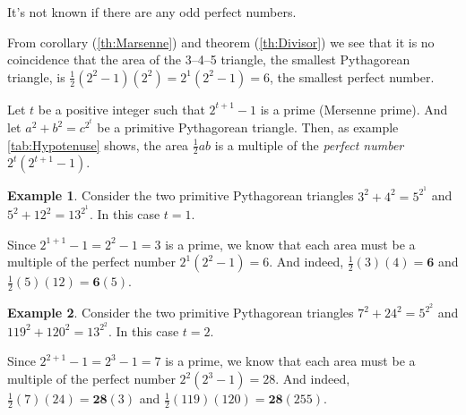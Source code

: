 \documentclass{article}
\theoremstyle{definition}
\newtheorem{example}{Example}[section]
\begin{document}
It's not known if there are any odd perfect numbers.

From corollary (\ref{th:Marsenne}) and theorem (\ref{th:Divisor}) we see that it is no coincidence that the area of the 3--4--5 triangle, the smallest Pythagorean triangle, is \(\frac{1}{2} (2^2-1) (2^2) = 2^1(2^2-1)=6\), the smallest perfect number.

Let \(t\) be a positive integer such that \(2^{t+1}-1\) is a prime (Mersenne prime). And let \(a^2+b^2=c^{2^t}\) be a primitive Pythagorean triangle. Then, as example \ref{tab:Hypotenuse} shows, the area \(\frac{1}{2} ab\) is a multiple of the \textit{perfect number} \(2^t(2^{t+1}-1)\).

\begin{example}
Consider the two primitive Pythagorean triangles \(3^2+4^2=5^{2^1}\) and \(5^2+12^2=13^{2^1}\). In this case \(t=1\).

Since \(2^{1+1}-1=2^2-1=3\) is a prime, we know that each area must be a multiple of the perfect number \(2^1(2^2-1)=6\). And indeed, \(\frac{1}{2}(3)(4) = \mathbf{6}\) and \(\frac{1}{2}(5)(12) = \mathbf{6}(5)\).
\end{example}

\begin{example}
Consider the two primitive Pythagorean triangles \(7^2+24^2 = 5^{2^2}\) and \(119^2+120^2=13^{2^2}\). In this case \(t=2\).

Since \(2^{2+1}-1=2^3-1=7\) is a prime, we know that each area must be a multiple of the perfect number \(2^2(2^3-1)=28\). And indeed, \(\frac{1}{2}(7)(24) = \mathbf{28}(3)\) and \(\frac{1}{2} (119)(120) = \mathbf{28}(255)\).
\end{example}
\end{document}
